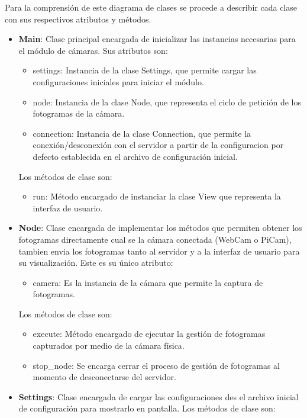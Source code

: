 Para la comprensión de este diagrama de clases se procede a describir cada clase con sus respectivos atributos y métodos.\\

\begin{itemize}
    \item \textbf{Main}: Clase principal encargada de inicializar las instancias necesarias para el módulo de cámaras. Sus atributos son:
        \begin{itemize}
            \item settings: Instancia de la clase Settings, que permite cargar las configuraciones iniciales para iniciar el módulo.
            \item node: Instancia de la clase Node, que representa el ciclo de petición de los fotogramas de la cámara.
            \item connection: Instancia de la clase Connection, que permite la conexión/desconexión con el servidor a partir de la configuracion por defecto establecida en el archivo de configuración inicial.
        \end{itemize}
        Los métodos de clase son:
        \begin{itemize}
            \item run: Método encargado de instanciar la clase View que representa la interfaz de usuario.
        \end{itemize}
    \item \textbf{Node}: Clase encargada de implementar los métodos que permiten obtener los fotogramas directamente cual se la cámara conectada (WebCam o PiCam), tambien envia los fotogramas tanto al servidor y a la interfaz de usuario para su visualización. Este es su único atributo:
        \begin{itemize}
            \item camera: Es la instancia de la cámara que permite la captura de fotogramas.            
        \end{itemize}
        Los métodos de clase son:
        \begin{itemize}
            \item execute: Método encargado de ejecutar la gestión de fotogramas capturados por medio de la cámara física.
            \item stop\_node: Se encarga cerrar el proceso de gestión de fotogramas al momento de desconectarse del servidor.
        \end{itemize}
    \item \textbf{Settings}: Clase encargada de cargar las configuraciones des el archivo inicial de configuración para mostrarlo en pantalla. Los métodos de clase son:

\end{itemize}
